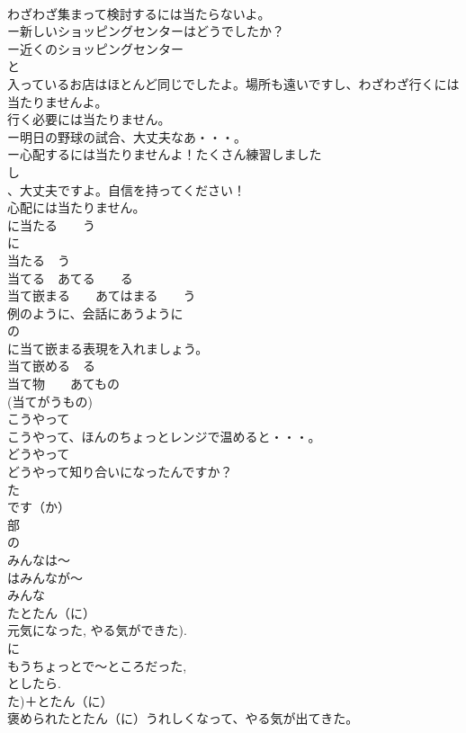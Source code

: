 \documentclass[8pt]{extreport}
\begin{document}
\begin{CJK}{UTF8}{min}
\\	わざわざ集まって検討するには当たらないよ。
\\	ー新しいショッピングセンターはどうでしたか？
\\	ー近くのショッピングセンター
\\	と
\\	入っているお店はほとんど同じでしたよ。場所も遠いですし、わざわざ行くには当たりませんよ。
\\	行く必要には当たりません。 
\\	ー明日の野球の試合、大丈夫なあ・・・。
\\	ー心配するには当たりませんよ！たくさん練習しました
\\	し
\\	、大丈夫ですよ。自信を持ってください！
\\	心配には当たりません。
\\	に当たる　　う
\\	に 
\\	当たる　う
\\	当てる　あてる　　る
\\	当て嵌まる　　あてはまる　　う
\\	例のように、会話にあうように
\\	の
\\	に当て嵌まる表現を入れましょう。
\\	当て嵌める　る
\\	当て物　　あてもの
\\	(当てがうもの) 
\\	こうやって
\\	こうやって、ほんのちょっとレンジで温めると・・・。
\\	どうやって　
\\	どうやって知り合いになったんですか？
\\	た
\\	です（か）	
\\	部
\\	の
\\	みんなは～
\\	はみんなが～
\\	みんな 
\\	たとたん（に）
\\	元気になった, やる気ができた).
\\	に 
\\	もうちょっとで～ところだった, 
\\	としたら.
\\	た)＋とたん（に）
\\	褒められたとたん（に）うれしくなって、やる気が出てきた。

\end{CJK}
\end{document}

